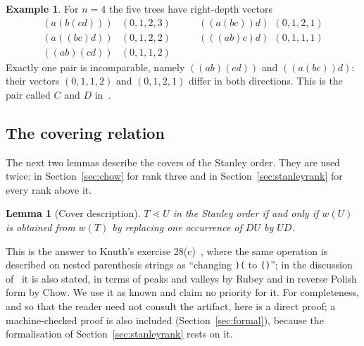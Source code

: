 \documentclass[11pt,a4paper]{article}
\theoremstyle{plain}
\newtheorem{lemma}[theorem]{Lemma}
\theoremstyle{definition}
\newtheorem{example}[theorem]{Example}
\begin{document}
\begin{example}\label{ex:four}
For $n=4$ the five trees have right-depth vectors
\[
  \begin{array}{lll}
  (a(b(cd)))&(0,1,2,3)\qquad& ((a(bc))d)\ \ (0,1,2,1)\\
  (a((bc)d))&(0,1,2,2)& (((ab)c)d)\ \ (0,1,1,1)\\
  ((ab)(cd))&(0,1,1,2)&
  \end{array}
\]
Exactly one pair is incomparable, namely $((ab)(cd))$ and $((a(bc))d)$: their
vectors $(0,1,1,2)$ and $(0,1,2,1)$ differ in both directions. This is the pair
called $C$ and $D$ in~\cite{MO}.
\end{example}
\subsection{The covering relation}

The next two lemmas describe the covers of the Stanley order. They are used twice: in
Section~\ref{sec:chow} for rank three and in Section~\ref{sec:stanleyrank} for every
rank above it.

\begin{lemma}[Cover description]\label{lem:stcover}
$T\lessdot U$ in the Stanley order if and only if $w(U)$ is obtained from $w(T)$ by
replacing one occurrence of $DU$ by $UD$.
\end{lemma}

This is the answer to Knuth's exercise 28(c)~\cite{Knuth}, where the same operation is
described on nested parenthesis strings as ``changing \texttt{)(} to \texttt{()}''; in
the discussion of~\cite{MO} it is also stated, in terms of peaks and valleys by Rubey
and in reverse Polish form by Chow. We use it as known and claim no
priority for it. For completeness, and so that the reader need not consult the artifact,
here is a direct proof; a machine-checked proof is also included
(Section~\ref{sec:formal}), because the formalisation of Section~\ref{sec:stanleyrank}
rests on it.
\end{document}
